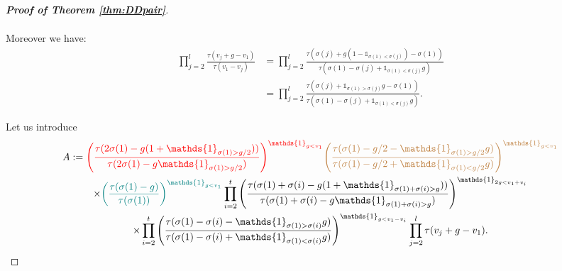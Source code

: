 \documentclass[11pt,letterpaper]{amsart}
\numberwithin{equation}{section}
\numberwithin{df}{section}
\begin{document}
\begin{proof}[\textbf{Proof of Theorem \ref{thm:DDpair}}]
\begin{multline}
\end{multline}

Moreover we have:
\begin{align*}
\prod_{j=2}^l\frac{\tau(v_j+g-v_1)}{\tau(v_1-v_j)}&=\prod_{j=2}^l\frac{\tau(\sigma(j)+g(1-\mathds{1}_{\sigma(1)<\sigma(j)})-\sigma(1))}{\tau(\sigma(1)-\sigma(j)+\mathds{1}_{\sigma(1)<\sigma(j)}g)}\\
&=\prod_{j=2}^l\frac{\tau(\sigma(j)+\mathds{1}_{\sigma(1)>\sigma(j)}g-\sigma(1))}{\tau(\sigma(1)-\sigma(j)+\mathds{1}_{\sigma(1)<\sigma(j)}g)}.
\end{align*}


Let us introduce
\begin{multline*}
A:=\textcolor{red}{\left(\frac{\tau(2\sigma(1)-g(1+\mathds{1}_{\sigma(1)>g/2}))}{\tau(2\sigma(1)-g\mathds{1}_{\sigma(1)>g/2})}\right)^{\mathds{1}_{g<v_1}}} \textcolor{brown}{\left(\frac{\tau(\sigma(1)-g/2-\mathds{1}_{\sigma(1)>g/2}g)}{\tau(\sigma(1)-g/2+\mathds{1}_{\sigma(1)<g/2}g)}\right)^{\mathds{1}_{g<v_1}}}
\\
\times \textcolor{teal}{\left(\frac{\tau(\sigma(1)-g)}{\tau(\sigma(1))}\right)^{\mathds{1}_{g<v_1}}}
 \prod_{i=2}^{t}\left(\frac{\tau(\sigma(1)+\sigma(i)-g(1+\mathds{1}_{\sigma(1)+\sigma(i)>g}))}{\tau(\sigma(1)+\sigma(i)-g\mathds{1}_{\sigma(1)+\sigma(i)>g})}\right)^{\mathds{1}_{2g<v_1+v_i}}\\
 \times \prod_{i=2}^{t} \left(\frac{\tau(\sigma(1)-\sigma(i)-\mathds{1}_{\sigma(1)>\sigma(i)}g)}{\tau(\sigma(1)-\sigma(i)+\mathds{1}_{\sigma(1)<\sigma(i)}g)}\right)^{\mathds{1}_{g<v_1-v_i}} \prod_{j=2}^l\tau(v_j+g-v_1).
\end{multline*}


\end{proof}
\end{document}
